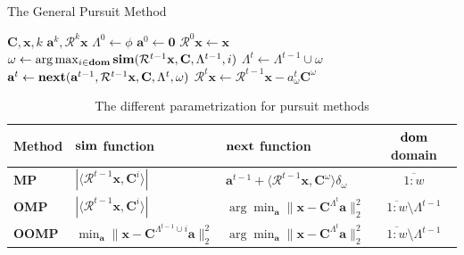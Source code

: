 \documentclass[12pt,a4paper,oneside,english]{UPBThesis}
\newcommand{\hcrange}[2]{\overline{{#1}\colon\!\!{#2}}}
\begin{document}
\begin{algorithm}
\caption{The General Pursuit Method}
\label{algo:GeneralPursuitMethod}
\begin{algorithmic}
\Require $\textbf{C},\textbf{x},k$
\Ensure $\textbf{a}^k,\mathcal{R}^k\textbf{x}$
\State $\Lambda^0 \gets \phi$
\State $\textbf{a}^0 \gets \textbf{0}$
\State $\mathcal{R}^0\textbf{x} \gets \textbf{x}$
\For {$t = \hcrange{1}{k}$}
\State $\omega \gets \arg \max_{i \in \textbf{dom}} \text{\textbf{sim}}(\mathcal{R}^{t-1}\textbf{x},\textbf{C},\Lambda^{t-1},i)$
\State $\Lambda^t \gets \Lambda^{t-1} \cup \omega$
\State $\textbf{a}^t \gets \text{\textbf{next}}(\textbf{a}^{t-1},\mathcal{R}^{t-1}\textbf{x},\textbf{C},\Lambda^t,\omega)$
\State $\mathcal{R}^t\textbf{x} \gets \mathcal{R}^{t-1}\textbf{x} - a_\omega^t\textbf{C}^\omega$
\EndFor
\end{algorithmic}
\end{algorithm}

\renewcommand{\arraystretch}{1.5}
\begin{table}
  \caption{The different parametrization for pursuit methods}
  \label{table:PursuitParametrization}
  \begin{tabularx}{\textwidth}{|l|>{\centering}X|>{\centering}X|c|}
       \hline
        Method & $\text{\textbf{sim}}$ function & $\text{\textbf{next}}$ function & $\text{\textbf{dom}}$ domain\\ \hline \hline
        \textbf{MP} & $\left| \langle \mathcal{R}^{t-1}\textbf{x} , \textbf{C}^i \rangle \right|$ & $\textbf{a}^{t-1} + \langle \mathcal{R}^{t-1}\textbf{x} , \textbf{C}^\omega \rangle \delta_\omega$ & $\hcrange{1}{w}$ \\  \hline
        \textbf{OMP} & $\left| \langle \mathcal{R}^{t-1}\textbf{x} , \textbf{C}^i \rangle \right|$ & $\arg\min_{\textbf{a}} {\| \textbf{x} - \textbf{C}^{\Lambda^t}\textbf{a} \|_2^2}$ & $\hcrange{1}{w} \setminus \Lambda^{t-1}$ \\ \hline
        \textbf{OOMP} & $\min_{\textbf{a}} {\| \textbf{x} - \textbf{C}^{\Lambda^{t-1} \cup i}\textbf{a} \|_2^2}$ & $\arg\min_{\textbf{a}} {\| \textbf{x} - \textbf{C}^{\Lambda^t}\textbf{a} \|_2^2}$ & $\hcrange{1}{w} \setminus \Lambda^{t-1}$ \\
       \hline
    \end{tabularx}
\end{table}
\renewcommand{\arraystretch}{1.0}
\end{document}
